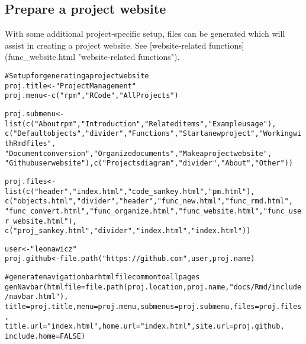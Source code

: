 \documentclass{article}\usepackage[]{graphicx}\usepackage[]{color}
\makeatletter
\newcommand{\hlnum}[1]{\textcolor[rgb]{0.863,0.196,0.184}{#1}}%
\newcommand{\hlstr}[1]{\textcolor[rgb]{0.863,0.196,0.184}{#1}}%
\newcommand{\hlcom}[1]{\textcolor[rgb]{0.345,0.431,0.459}{#1}}%
\newcommand{\hlstd}[1]{\textcolor[rgb]{0.514,0.58,0.588}{#1}}%
\newcommand{\hlkwb}[1]{\textcolor[rgb]{0.522,0.6,0}{#1}}%
\newcommand{\hlkwc}[1]{\textcolor[rgb]{0.796,0.294,0.086}{#1}}%
\newcommand{\hlkwd}[1]{\textcolor[rgb]{0.576,0.631,0.631}{#1}}%
\newenvironment{kframe}{%
 \def\at@end@of@kframe{}%
 \ifinner\ifhmode%
  \def\at@end@of@kframe{\end{minipage}}%
  \begin{minipage}{\columnwidth}%
 \fi\fi%
 \def\FrameCommand##1{\hskip\@totalleftmargin \hskip-\fboxsep
 \colorbox{shadecolor}{##1}\hskip-\fboxsep
     \hskip-\linewidth \hskip-\@totalleftmargin \hskip\columnwidth}%
 \MakeFramed {\advance\hsize-\width
   \@totalleftmargin\z@ \linewidth\hsize
   \@setminipage}}%
 {\par\unskip\endMakeFramed%
 \at@end@of@kframe}
\newenvironment{knitrout}{}{} %
\makeatother
\begin{document}
\subsection{Prepare a project website}
With some additional project-specific setup, files can be generated which will assist in creating a project website.
See [website-related functions](func\_website.html "website-related functions").

\begin{knitrout}
\color{fgcolor}\begin{kframe}
\begin{alltt}
\hlcom{# Setup for generating a project website}
\hlstd{proj.title} \hlkwb{<-} \hlstr{"Project Management"}
\hlstd{proj.menu} \hlkwb{<-} \hlkwd{c}\hlstd{(}\hlstr{"rpm"}\hlstd{,} \hlstr{"R Code"}\hlstd{,} \hlstr{"All Projects"}\hlstd{)}

\hlstd{proj.submenu} \hlkwb{<-} \hlkwd{list}\hlstd{(}\hlkwd{c}\hlstd{(}\hlstr{"About rpm"}\hlstd{,} \hlstr{"Introduction"}\hlstd{,} \hlstr{"Related items"}\hlstd{,} \hlstr{"Example usage"}\hlstd{),}
    \hlkwd{c}\hlstd{(}\hlstr{"Default objects"}\hlstd{,} \hlstr{"divider"}\hlstd{,} \hlstr{"Functions"}\hlstd{,} \hlstr{"Start a new project"}\hlstd{,} \hlstr{"Working with Rmd files"}\hlstd{,}
        \hlstr{"Document conversion"}\hlstd{,} \hlstr{"Organize documents"}\hlstd{,} \hlstr{"Make a project website"}\hlstd{,}
        \hlstr{"Github user website"}\hlstd{),} \hlkwd{c}\hlstd{(}\hlstr{"Projects diagram"}\hlstd{,} \hlstr{"divider"}\hlstd{,} \hlstr{"About"}\hlstd{,} \hlstr{"Other"}\hlstd{))}

\hlstd{proj.files} \hlkwb{<-} \hlkwd{list}\hlstd{(}\hlkwd{c}\hlstd{(}\hlstr{"header"}\hlstd{,} \hlstr{"index.html"}\hlstd{,} \hlstr{"code_sankey.html"}\hlstd{,} \hlstr{"pm.html"}\hlstd{),}
    \hlkwd{c}\hlstd{(}\hlstr{"objects.html"}\hlstd{,} \hlstr{"divider"}\hlstd{,} \hlstr{"header"}\hlstd{,} \hlstr{"func_new.html"}\hlstd{,} \hlstr{"func_rmd.html"}\hlstd{,}
        \hlstr{"func_convert.html"}\hlstd{,} \hlstr{"func_organize.html"}\hlstd{,} \hlstr{"func_website.html"}\hlstd{,} \hlstr{"func_user_website.html"}\hlstd{),}
    \hlkwd{c}\hlstd{(}\hlstr{"proj_sankey.html"}\hlstd{,} \hlstr{"divider"}\hlstd{,} \hlstr{"index.html"}\hlstd{,} \hlstr{"index.html"}\hlstd{))}

\hlstd{user} \hlkwb{<-} \hlstr{"leonawicz"}
\hlstd{proj.github} \hlkwb{<-} \hlkwd{file.path}\hlstd{(}\hlstr{"https://github.com"}\hlstd{, user, proj.name)}

\hlcom{# generate navigation bar html file common to all pages}
\hlkwd{genNavbar}\hlstd{(}\hlkwc{htmlfile} \hlstd{=} \hlkwd{file.path}\hlstd{(proj.location, proj.name,} \hlstr{"docs/Rmd/include/navbar.html"}\hlstd{),}
    \hlkwc{title} \hlstd{= proj.title,} \hlkwc{menu} \hlstd{= proj.menu,} \hlkwc{submenus} \hlstd{= proj.submenu,} \hlkwc{files} \hlstd{= proj.files,}
    \hlkwc{title.url} \hlstd{=} \hlstr{"index.html"}\hlstd{,} \hlkwc{home.url} \hlstd{=} \hlstr{"index.html"}\hlstd{,} \hlkwc{site.url} \hlstd{= proj.github,}
    \hlkwc{include.home} \hlstd{=} \hlnum{FALSE}\hlstd{)}


\end{alltt}
\end{kframe}
\end{knitrout}
\end{document}
